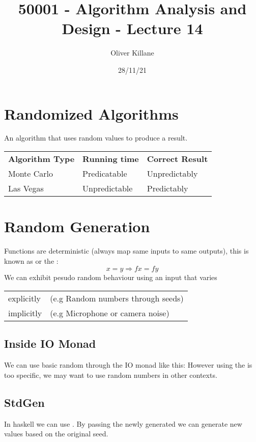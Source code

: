 \documentclass{report}
\title{50001 - Algorithm Analysis and Design - Lecture 14}
\author{Oliver Killane}
\date{28/11/21}
\begin{document}
\maketitle
{}

\section*{Randomized Algorithms}
An algorithm that uses random values to produce a result.
\begin{center}
	\begin{tabular}{l l l}
		\textbf{Algorithm Type} & \textbf{Running time} & \textbf{Correct Result} \\
		Monte Carlo             & Predicatable          & Unpredictably           \\
		Las Vegas               & Unpredictable         & Predictably             \\
	\end{tabular}
\end{center}

\section*{Random Generation}

Functions are deterministic (always map same inputs to same outputs), this is known as  or the :
\[x = y \Rightarrow f x = f y\]
We can exhibit pesudo random behaviour using an input that varies \begin{tabular}{l l}
	explicitly & (e.g Random numbers through seeds) \\
	implicitly & (e.g Microphone or camera noise)   \\
\end{tabular}

\subsection*{Inside IO Monad}
We can use basic random through the IO monad like this:
However using the  is too specific, we may want to use random numbers in other contexts.

\subsection*{StdGen}
In haskell we can use .
By passing the newly generated  we can generate new values based on the original seed.
\end{document}
